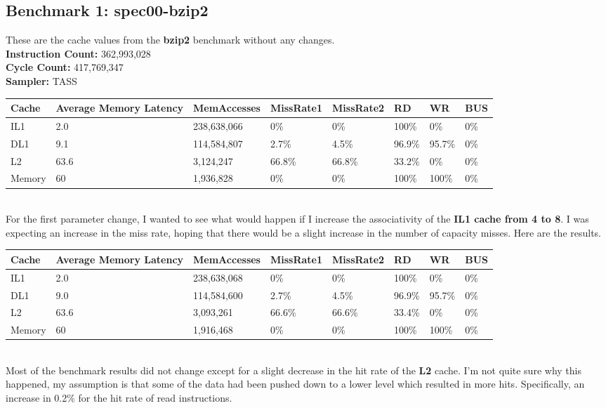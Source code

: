 \documentclass[12pt]{article}
\begin{document}
\subsection*{Benchmark 1: spec00-bzip2}
These are the cache values from the \textbf{bzip2} benchmark without any changes.\\
\textbf{Instruction Count:} 362,993,028\\
\textbf{Cycle Count:} 417,769,347\\
\textbf{Sampler:} TASS\\
\begin{table}[!h]
\centering
\begin{tabular}{|l|l|l|l|l|l|l|l|}
\hline
\rowcolor[HTML]{C0C0C0} 
Cache & Average Memory Latency & MemAccesses & MissRate1 & MissRate2 & RD & WR & BUS \\ \hline
\cellcolor[HTML]{EFEFEF}IL1 & 2.0 & 238,638,066 & 0\% & 0\% & 100\% & 0\% & 0\% \\ \hline
\cellcolor[HTML]{EFEFEF}DL1 & 9.1 & 114,584,807 & 2.7\% & 4.5\% & 96.9\% & 95.7\% & 0\% \\ \hline
\cellcolor[HTML]{EFEFEF}L2 & 63.6 & 3,124,247 & 66.8\% & 66.8\% & 33.2\% & 0\% & 0\% \\ \hline
\cellcolor[HTML]{EFEFEF}Memory & 60 & 1,936,828 & 0\% & 0\% & 100\% & 100\% & 0\% \\ \hline
\end{tabular}
\end{table}\\
For the first parameter change, I wanted to see what would happen if I increase the associativity of the \textbf{IL1 cache from 4 to 8}. I was expecting an increase in the miss rate, hoping that there would be a slight increase in the number of capacity misses. Here are the results.
\begin{table}[!h]
\centering
\begin{tabular}{|l|l|l|l|l|l|l|l|}
\hline
\rowcolor[HTML]{C0C0C0} 
Cache & Average Memory Latency & MemAccesses & MissRate1 & MissRate2 & RD & WR & BUS \\ \hline
IL1 & 2.0 & 238,638,068 & 0\% & 0\% & 100\% & 0\% & 0\% \\ \hline
DL1 & 9.0 & 114,584,600 & 2.7\% & 4.5\% & 96.9\% & 95.7\% & 0\% \\ \hline
L2 & 63.6 & 3,093,261 & 66.6\% & 66.6\% & 33.4\% & 0\% & 0\% \\ \hline
Memory & 60 & 1,916,468 & 0\% & 0\% & 100\% & 100\% & 0\% \\ \hline
\end{tabular}
\end{table}\\
Most of the benchmark results did not change except for a slight decrease in the hit rate of the \textbf{L2} cache. I'm not quite sure why this happened, my assumption is that some of the data had been pushed down to a lower level which resulted in more hits. Specifically, an increase in 0.2\% for the hit rate of read instructions.\\
\end{document}
